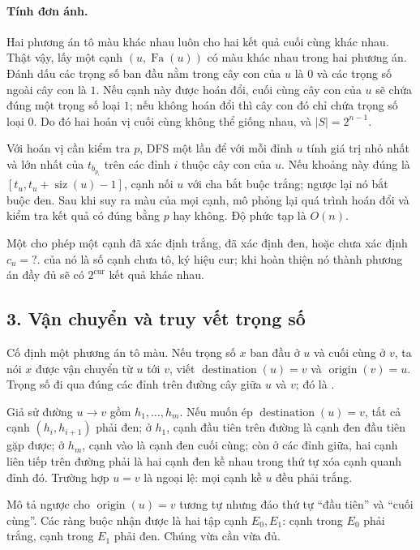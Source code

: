 \documentclass[11pt]{article}
\begin{document}
\paragraph{Tính đơn ánh.}
Hai phương án tô màu khác nhau luôn cho hai kết quả cuối cùng khác nhau. Thật
vậy, lấy một cạnh \((u,\operatorname{Fa}(u))\) có màu khác nhau trong hai
phương án. Đánh dấu các trọng số ban đầu nằm trong cây con của \(u\) là \(0\)
và các trọng số ngoài cây con là \(1\). Nếu cạnh này được hoán đổi, cuối cùng
cây con của \(u\) sẽ chứa đúng một trọng số loại \(1\); nếu không hoán đổi thì
cây con đó chỉ chứa trọng số loại \(0\). Do đó hai hoán vị cuối cùng không thể
giống nhau, và \(|S|=2^{n-1}\).

Với hoán vị cần kiểm tra \(p\), DFS một lần để với mỗi đỉnh \(u\) tính giá trị
nhỏ nhất và lớn nhất của \(t_{b_{p_i}}\) trên các đỉnh \(i\) thuộc cây con của
\(u\). Nếu khoảng này đúng là \([t_u,t_u+\operatorname{siz}(u)-1]\), cạnh nối
\(u\) với cha bắt buộc trắng; ngược lại nó bắt buộc đen. Sau khi suy ra màu
của mọi cạnh, mô phỏng lại quá trình hoán đổi và kiểm tra kết quả có đúng bằng
\(p\) hay không. Độ phức tạp là \(O(n)\).

Một  cho phép một cạnh đã xác định trắng, đã
xác định đen, hoặc chưa xác định \(c_u=?\).  của nó là số cạnh
chưa tô, ký hiệu \(\mathrm{cur}\); khi hoàn thiện nó thành phương án đầy đủ sẽ
có \(2^{\mathrm{cur}}\) kết quả khác nhau.

\subsection*{3. Vận chuyển và truy vết trọng số}

Cố định một phương án tô màu. Nếu trọng số \(x\) ban đầu ở \(u\) và cuối cùng
ở \(v\), ta nói \(x\) được vận chuyển từ \(u\) tới \(v\), viết
\(\operatorname{destination}(u)=v\) và \(\operatorname{origin}(v)=u\). Trọng số
đi qua đúng các đỉnh trên đường cây giữa \(u\) và \(v\); đó là
.

Giả sử đường \(u\to v\) gồm \(h_1,\ldots,h_m\). Nếu muốn ép
\(\operatorname{destination}(u)=v\), tất cả cạnh \((h_i,h_{i+1})\) phải đen;
ở \(h_1\), cạnh đầu tiên trên đường là cạnh đen đầu tiên gặp được; ở \(h_m\),
cạnh vào là cạnh đen cuối cùng; còn ở các đỉnh giữa, hai cạnh liên tiếp trên
đường phải là hai cạnh đen kề nhau trong thứ tự xóa cạnh quanh đỉnh đó. Trường
hợp \(u=v\) là ngoại lệ: mọi cạnh kề \(u\) đều phải trắng.

Mô tả ngược cho \(\operatorname{origin}(u)=v\) tương tự nhưng đảo thứ tự
``đầu tiên'' và ``cuối cùng''. Các ràng buộc nhận được là hai tập cạnh
\(E_0,E_1\): cạnh trong \(E_0\) phải trắng, cạnh trong \(E_1\) phải đen. Chúng
vừa cần vừa đủ.
\end{document}
